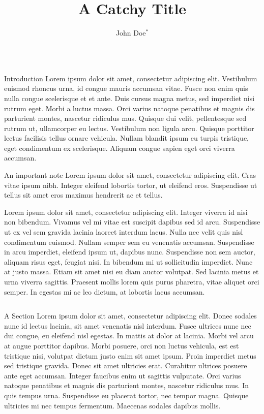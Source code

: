 \documentclass[final]{beamer}
\title{A Catchy Title}
\author{John Doe$^*$}
\institute{$^*$ Nowhere}
\begin{document}
\begin{poster}
\begin{column}{\onecolwidth} %
  \begin{block}{Introduction}
  Lorem ipsum dolor sit amet, consectetur adipiscing elit. Vestibulum euismod rhoncus urna, id congue mauris accumsan vitae. Fusce non enim quis nulla congue scelerisque et et ante. Duis cursus magna metus, sed imperdiet nisi rutrum eget. Morbi a luctus massa. Orci varius natoque penatibus et magnis dis parturient montes, nascetur ridiculus mus. Quisque dui velit, pellentesque sed rutrum ut, ullamcorper eu lectus. Vestibulum non ligula arcu. Quisque porttitor lectus facilisis tellus ornare vehicula. Nullam blandit ipsum eu turpis tristique, eget condimentum ex scelerisque. Aliquam congue sapien eget orci viverra accumsan.
  
  \begin{alertblock}{An important note}
    Lorem ipsum dolor sit amet, consectetur adipiscing elit. Cras vitae ipsum nibh. Integer eleifend lobortis tortor, ut eleifend eros. Suspendisse ut tellus sit amet eros maximus hendrerit ac et tellus.
  \end{alertblock}
  
  Lorem ipsum dolor sit amet, consectetur adipiscing elit. Integer viverra id nisi non bibendum. Vivamus vel mi vitae est suscipit dapibus sed id arcu. Suspendisse ut ex vel sem gravida lacinia laoreet interdum lacus. Nulla nec velit quis nisl condimentum euismod. Nullam semper sem eu venenatis accumsan. Suspendisse in arcu imperdiet, eleifend ipsum ut, dapibus nunc. Suspendisse non sem auctor, aliquam risus eget, feugiat nisi. In bibendum mi ut sollicitudin imperdiet. Nunc at justo massa. Etiam sit amet nisi eu diam auctor volutpat. Sed lacinia metus et urna viverra sagittis. Praesent mollis lorem quis purus pharetra, vitae aliquet orci semper. In egestas mi ac leo dictum, at lobortis lacus accumsan.
  \end{block}
\end{column}
\separator
\begin{column}{\onecolwidth}
  \begin{block}{A Section}
  Lorem ipsum dolor sit amet, consectetur adipiscing elit. Donec sodales nunc id lectus lacinia, sit amet venenatis nisl interdum. Fusce ultrices nunc nec dui congue, eu eleifend nisl egestas. In mattis at dolor at lacinia. Morbi vel arcu at augue porttitor dapibus. Morbi posuere, orci non luctus vehicula, est est tristique nisi, volutpat dictum justo enim sit amet ipsum. Proin imperdiet metus sed tristique gravida. Donec sit amet ultricies erat. Curabitur ultrices posuere ante eget accumsan. Integer faucibus enim ut sagittis vulputate. Orci varius natoque penatibus et magnis dis parturient montes, nascetur ridiculus mus. In quis tempus urna. Suspendisse eu placerat tortor, nec tempor magna. Quisque ultricies mi nec tempus fermentum. Maecenas sodales dapibus mollis.


\end{block}
\end{column}
\end{poster}
\end{document}
